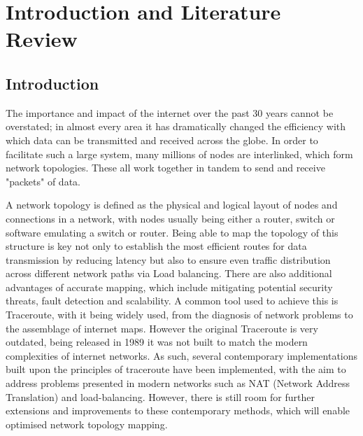 \section{Introduction and Literature Review}




\subsection{Introduction}
The importance and impact of the internet over the past 30 years cannot be overstated; in almost every area it has dramatically changed the efficiency with which data can be transmitted and received across the globe. In order to facilitate such a large system, many millions of nodes are interlinked, which form network topologies. These all work together in tandem to send and receive "packets" of data. 

A network topology is defined as the physical and logical layout of nodes and connections in a network, with nodes usually being either a router, switch or software emulating a switch or router. Being able to map the topology of this structure is key not only to establish the most efficient routes for data transmission by reducing latency but also to ensure even traffic distribution across different network paths via Load balancing. There are also additional advantages of accurate mapping, which include mitigating potential security threats, fault detection and scalability. A common tool used to achieve this is Traceroute, with it being widely used, from the diagnosis of network
problems to the assemblage of internet maps. \cite{anomalies} However the original Traceroute is very outdated, being released in 1989 \cite{jacobson1989traceroute} it was not built to match the modern complexities of internet networks. As such, several contemporary implementations built upon the principles of traceroute have been implemented, with the aim to address problems presented in modern networks such as NAT (Network Address Translation) and load-balancing. However, there is still room for further extensions and improvements to these contemporary methods, which will enable optimised network topology mapping. 

